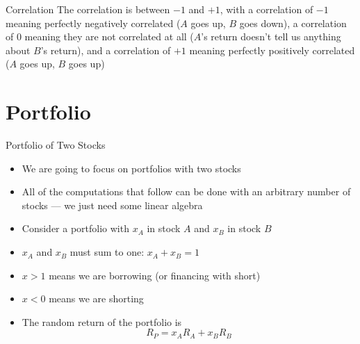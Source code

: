 \documentclass{beamer}
\begin{document}
\begin{frame}{Correlation}
		The correlation is between $-1$ and $+1$, with a correlation of $-1$ meaning perfectly negatively correlated ($A$ goes up, $B$ goes down), a correlation of $0$ meaning they are not correlated at all ($A$'s return doesn't tell us anything about $B$'s return), and a correlation of $+1$ meaning perfectly positively correlated ($A$ goes up, $B$ goes up) 
\end{frame}

\section{Portfolio}
\begin{frame}{Portfolio of Two Stocks}
	\begin{itemize}
		\item We are going to focus on portfolios with two stocks
		\item All of the computations that follow can be done with an arbitrary number of stocks --- we just need some linear algebra 	
		\item Consider a portfolio with $x_{A}$ in stock $A$ and $x_{B}$ in stock $B$
		\item $x_{A}$ and $x_{B}$ must sum to one: $x_{A}+x_{B}=1$
		\item $x>1$ means we are borrowing (or financing with short)
		\item $x<0$ means we are shorting
		\item The random return of the portfolio is
		\begin{equation*}
			R_{P}=x_{A}R_{A}+x_{B}R_{B}
		\end{equation*}
	\end{itemize}
\end{frame}
\end{document}
